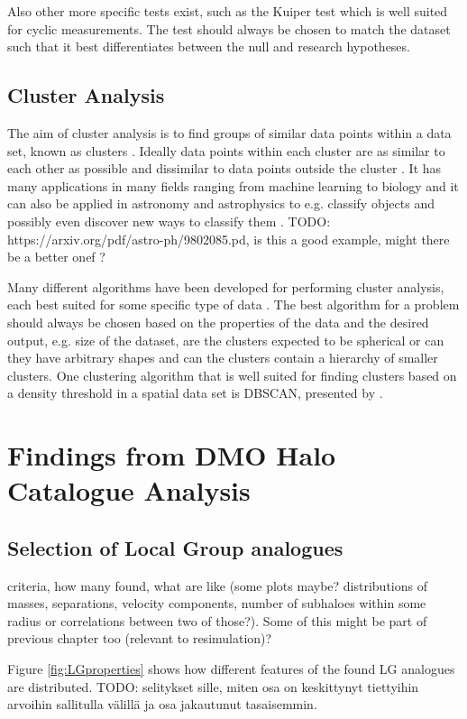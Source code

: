 \documentclass[english, oneside]{HYgradu}
\begin{document}
Also other more specific tests exist, such as the Kuiper test which is well suited for cyclic measurements. The test should always be chosen to match the dataset such that it best differentiates between the null and research hypotheses.

\section{Cluster Analysis}
The aim of cluster analysis is to find groups of similar data points within a data set, known as clusters \citep{han2000data}. Ideally data points within each cluster are as similar to each other as possible and dissimilar to data points outside the cluster \citep{han2000data}. It has many applications in many fields ranging from machine learning to biology and it can also be applied in astronomy and astrophysics to e.g. classify objects and possibly even discover new ways to classify them \citep{ball2010data, han2000data}. TODO: https://arxiv.org/pdf/astro-ph/9802085.pd, is this a good example, might there be a better onef ? %

Many different algorithms have been developed for performing cluster analysis, each best suited for some specific type of data \citep{han2000data}. The best algorithm for a problem should always be chosen based on the properties of the data and the desired output, e.g. size of the dataset, are the clusters expected to be spherical or can they have arbitrary shapes and can the clusters contain a hierarchy of smaller clusters. One clustering algorithm that is well suited for finding clusters based on a density threshold in a spatial data set is DBSCAN, presented by \citet{ester1996density}.


\chapter{Findings from DMO Halo Catalogue Analysis}
\section{Selection of Local Group analogues}
criteria, how many found, what are like (some plots maybe? distributions of masses, separations, velocity components, number of subhaloes within some radius or correlations between two of those?). Some of this might be part of previous chapter too (relevant to resimulation)?

\reversemarginpar
{}
Figure \ref{fig:LGproperties} shows how different features of the found LG analogues are distributed. TODO: selitykset sille, miten osa on keskittynyt tiettyihin arvoihin sallitulla välillä ja osa jakautunut tasaisemmin. 
\end{document}
